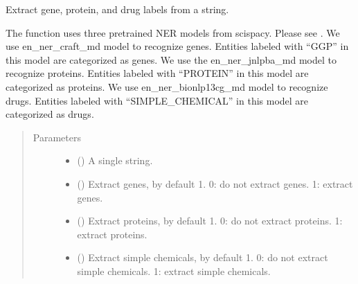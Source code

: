 \documentclass[letterpaper,10pt,english]{sphinxmanual}
\begin{document}
\begin{fulllineitems}
\label{\detokenize{biomarker_extraction:biomarker_extraction.gene_protein_chemical}}
\sphinxAtStartPar
Extract gene, protein, and drug labels from a string.

\sphinxAtStartPar
The function uses three pre\sphinxhyphen{}trained NER models from scispacy. Please see . We use en\_ner\_craft\_md model to recognize genes. Entities labeled with “GGP” in this model are categorized as genes. We use the en\_ner\_jnlpba\_md model to recognize proteins. Entities labeled with “PROTEIN” in this model are categorized as proteins. We use en\_ner\_bionlp13cg\_md model to recognize drugs. Entities labeled with “SIMPLE\_CHEMICAL” in this model are categorized as drugs.
\begin{quote}\begin{description}
\item[{Parameters}] \leavevmode\begin{itemize}
\item {} 
\sphinxAtStartPar
{} () \textendash{} A single string.

\item {} 
\sphinxAtStartPar
{} (\sphinxstyleliteralemphasis{\sphinxupquote{, }}) \textendash{} Extract genes, by default 1.
0: do not extract genes. 1: extract genes.

\item {} 
\sphinxAtStartPar
{} (\sphinxstyleliteralemphasis{\sphinxupquote{, }}) \textendash{} Extract proteins, by default 1.
0: do not extract proteins. 1: extract proteins.

\item {} 
\sphinxAtStartPar
{} (\sphinxstyleliteralemphasis{\sphinxupquote{, }}) \textendash{} Extract simple chemicals, by default 1.
0: do not extract simple chemicals. 1: extract simple chemicals.


\end{itemize}
\end{description}
\end{quote}
\end{fulllineitems}
\end{document}
